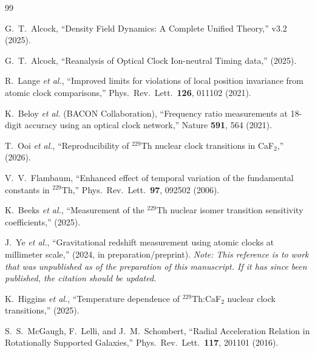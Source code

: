 \documentclass[twocolumn,showpacs,preprintnumbers,amsmath,amssymb,prd]{revtex4-2}
\begin{document}

\begin{thebibliography}{99}

G.~T.~Alcock,
``Density Field Dynamics: A Complete Unified Theory,''
v3.2 (2025).

G.~T.~Alcock,
``Reanalysis of Optical Clock Ion-neutral Timing data,''
(2025).

R.~Lange \textit{et al.},
``Improved limits for violations of local position invariance from atomic clock comparisons,''
Phys.\ Rev.\ Lett.\ \textbf{126}, 011102 (2021).

K.~Beloy \textit{et al.} (BACON Collaboration),
``Frequency ratio measurements at 18-digit accuracy using an optical clock network,''
Nature \textbf{591}, 564 (2021).

T.~Ooi \textit{et al.},
``Reproducibility of $^{229}$Th nuclear clock transitions in CaF$_2$,''
(2026).

V.~V.~Flambaum,
``Enhanced effect of temporal variation of the fundamental constants in $^{229}$Th,''
Phys.\ Rev.\ Lett.\ \textbf{97}, 092502 (2006).

K.~Beeks \textit{et al.},
``Measurement of the $^{229}$Th nuclear isomer transition sensitivity coefficients,''
(2025).

J.~Ye \textit{et al.},
``Gravitational redshift measurement using atomic clocks at millimeter scale,''
(2024, in preparation/preprint).
\textit{Note: This reference is to work that was unpublished as of the
preparation of this manuscript.  If it has since been published, the
citation should be updated.}

K.~Higgins \textit{et al.},
``Temperature dependence of $^{229}$Th:CaF$_2$ nuclear clock transitions,''
(2025).

S.~S.~McGaugh, F.~Lelli, and J.~M.~Schombert,
``Radial Acceleration Relation in Rotationally Supported Galaxies,''
Phys.\ Rev.\ Lett.\ \textbf{117}, 201101 (2016).

\end{thebibliography}
\end{document}
